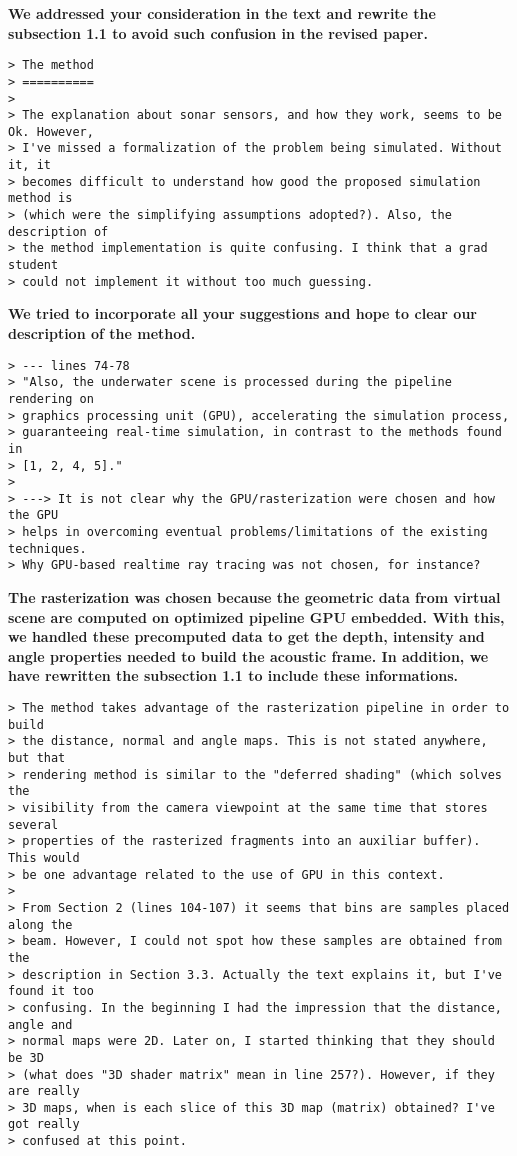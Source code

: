 \documentclass{article}
\begin{document}
\textbf{We addressed your consideration in the text and rewrite the
subsection 1.1 to avoid such confusion in the revised paper.}

\begin{verbatim}
> The method
> ==========
>
> The explanation about sonar sensors, and how they work, seems to be Ok. However,
> I've missed a formalization of the problem being simulated. Without it, it
> becomes difficult to understand how good the proposed simulation method is
> (which were the simplifying assumptions adopted?). Also, the description of
> the method implementation is quite confusing. I think that a grad student
> could not implement it without too much guessing.
\end{verbatim}

\textbf{We tried to incorporate all your suggestions and hope to clear our description of
the method.}

\begin{verbatim}
> --- lines 74-78
> "Also, the underwater scene is processed during the pipeline rendering on
> graphics processing unit (GPU), accelerating the simulation process,
> guaranteeing real-time simulation, in contrast to the methods found in
> [1, 2, 4, 5]."
>
> ---> It is not clear why the GPU/rasterization were chosen and how the GPU
> helps in overcoming eventual problems/limitations of the existing techniques.
> Why GPU-based realtime ray tracing was not chosen, for instance?
\end{verbatim}

\textbf{The rasterization was chosen because the geometric data from virtual
scene are computed on optimized pipeline GPU embedded. With this, we handled
these precomputed data to get the depth, intensity and angle properties needed
to build the acoustic frame. In addition, we have rewritten the subsection 1.1
to include these informations.}

\begin{verbatim}
> The method takes advantage of the rasterization pipeline in order to build
> the distance, normal and angle maps. This is not stated anywhere, but that
> rendering method is similar to the "deferred shading" (which solves the
> visibility from the camera viewpoint at the same time that stores several
> properties of the rasterized fragments into an auxiliar buffer). This would
> be one advantage related to the use of GPU in this context.
>
> From Section 2 (lines 104-107) it seems that bins are samples placed along the
> beam. However, I could not spot how these samples are obtained from the
> description in Section 3.3. Actually the text explains it, but I've found it too
> confusing. In the beginning I had the impression that the distance, angle and
> normal maps were 2D. Later on, I started thinking that they should be 3D
> (what does "3D shader matrix" mean in line 257?). However, if they are really
> 3D maps, when is each slice of this 3D map (matrix) obtained? I've got really
> confused at this point.
\end{verbatim}
\end{document}
